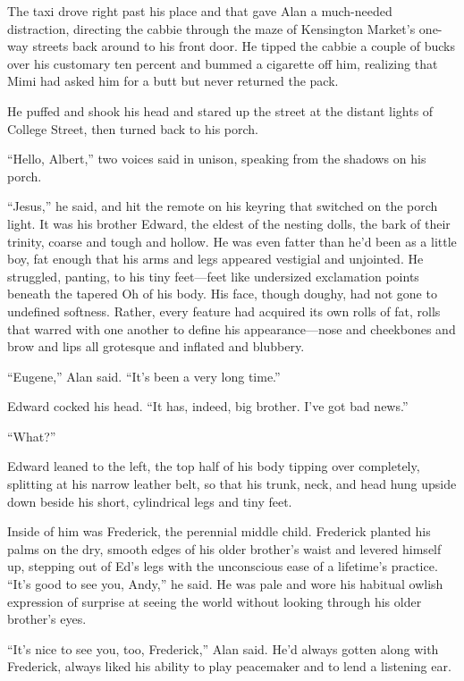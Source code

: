 The taxi drove right past his place and that gave Alan a much-needed
distraction, directing the cabbie through the maze of Kensington
Market's one-way streets back around to his front door.  He tipped the
cabbie a couple of bucks over his customary ten percent and bummed a
cigarette off him, realizing that Mimi had asked him for a butt but
never returned the pack.

He puffed and shook his head and stared up the street at the distant
lights of College Street, then turned back to his porch.

``Hello, Albert,'' two voices said in unison, speaking from the
shadows on his porch.

``Jesus,'' he said, and hit the remote on his keyring that switched on
the porch light.  It was his brother Edward, the eldest of the nesting
dolls, the bark of their trinity, coarse and tough and hollow.  He was
even fatter than he'd been as a little boy, fat enough that his arms
and legs appeared vestigial and unjointed.  He struggled, panting, to
his tiny feet---feet like undersized exclamation points beneath the
tapered Oh of his body.  His face, though doughy, had not gone to
undefined softness.  Rather, every feature had acquired its own rolls
of fat, rolls that warred with one another to define his
appearance---nose and cheekbones and brow and lips all grotesque and
inflated and blubbery.

``Eugene,'' Alan said.  ``It's been a very long time.''

Edward cocked his head.  ``It has, indeed, big brother.  I've got bad
news.''

``What?''

Edward leaned to the left, the top half of his body tipping over
completely, splitting at his narrow leather belt, so that his trunk,
neck, and head hung upside down beside his short, cylindrical legs and
tiny feet.

Inside of him was Frederick, the perennial middle child.  Frederick
planted his palms on the dry, smooth edges of his older brother's
waist and levered himself up, stepping out of Ed's legs with the
unconscious ease of a lifetime's practice.  ``It's good to see you,
Andy,'' he said.  He was pale and wore his habitual owlish expression
of surprise at seeing the world without looking through his older
brother's eyes.

``It's nice to see you, too, Frederick,'' Alan said.  He'd always
gotten along with Frederick, always liked his ability to play
peacemaker and to lend a listening ear.

